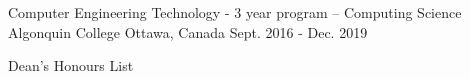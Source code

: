 

\begin{cventries}

  \cventry
    {Computer Engineering Technology - 3 year program – Computing Science} %
    {Algonquin College} %
    {Ottawa, Canada} %
    {Sept. 2016 - Dec. 2019} %
    {
      \begin{cvitems} %
        \item {Dean’s Honours List}
      \end{cvitems}
    }

\end{cventries}
